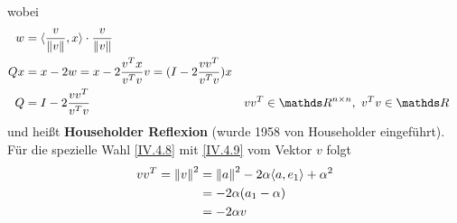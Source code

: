 wobei
\begin{align}
  \nonumber
  w &= \scp{\frac{v}{\nn[v]}}{x} \cdot \frac{v}{\nn[v]} \\ %
  Qx &= x-2w = x-2\frac{v^Tx}{v^Tv}v 
       = (I-2\frac{vv^T}{v^Tv})x 
       \label{IV.4.10}\\
  Q  &= I-2\frac{vv^T}{v^Tv}&& vv^T \in \Renn,\,\, v^Tv\in\R
                               \label{IV.4.11}
\end{align}
und heißt \textbf{Householder Reflexion} 
(wurde  1958 von Householder eingeführt).  \\
Für die spezielle Wahl \eqref{IV.4.8} mit \eqref{IV.4.9} vom Vektor $v$ folgt
\begin{align}\nonumber
  vv^T = \nn[v]^2 &= \nn[a]^2 - 2\alpha\scp{a}{e_1} + \alpha^2 \\ \nonumber
                  &= -2\alpha(a_1-\alpha) \\
                  & = -2\alpha v
                    \label{IV.4.12}
\end{align}


